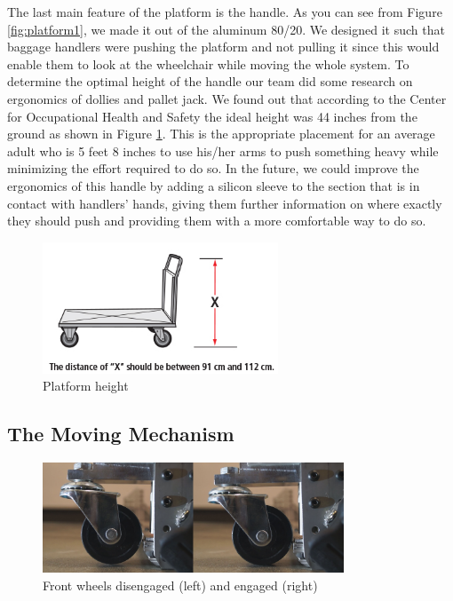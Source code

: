 The last main feature of the platform is the handle. As you can see from Figure \ref{fig:platform1}, we made it out of the aluminum 80/20. We designed it such that baggage handlers were pushing the platform and not pulling it since this would enable them to look at the wheelchair while moving the whole system. To determine the optimal height of the handle our team did some research on ergonomics of dollies and pallet jack. We found out that according to the Center for Occupational Health and Safety the ideal height was 44 inches from the ground as shown in Figure \ref{fig:platform4}. This is the appropriate placement for an average adult who is 5 feet 8 inches  to use his/her arms to push something heavy while minimizing the effort required to do so. In the future, we could improve the ergonomics of this handle by adding a silicon sleeve to the section that is in contact with handlers’ hands, giving them further information on where exactly they should push and providing them with a more comfortable way to do so.

\begin{figure}[h]
\centering
\includegraphics[width=7cm]{images/platform4}
\caption{Platform height}
\label{fig:platform4}
\end{figure}

\subsection{The Moving Mechanism}

\begin{figure}
\centering
 \includegraphics[width=0.8\textwidth]{images/front_wheel}
\caption{Front wheels disengaged (left) and engaged (right)}
\label{fig:front_wheels}
\end{figure}

